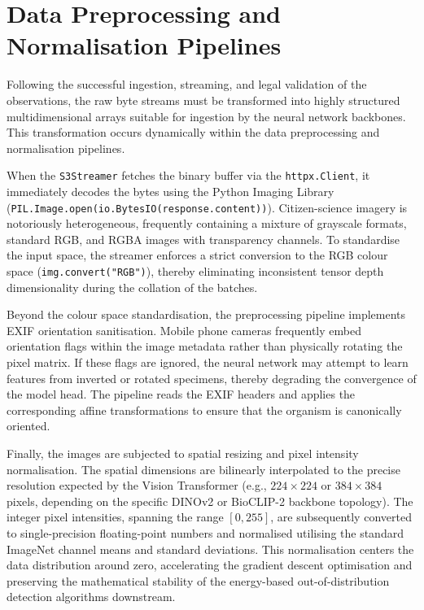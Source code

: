 \section{Data Preprocessing and Normalisation Pipelines}
\label{sec:preprocessing_normalisation}

Following the successful ingestion, streaming, and legal validation of the observations, the raw byte streams must be transformed into highly structured multidimensional arrays suitable for ingestion by the neural network backbones. This transformation occurs dynamically within the data preprocessing and normalisation pipelines.

When the \texttt{S3Streamer} fetches the binary buffer via the \texttt{httpx.Client}, it immediately decodes the bytes using the Python Imaging Library (\texttt{PIL.Image.open(io.BytesIO(response.content))}). Citizen-science imagery is notoriously heterogeneous, frequently containing a mixture of grayscale formats, standard RGB, and RGBA images with transparency channels. To standardise the input space, the streamer enforces a strict conversion to the RGB colour space (\texttt{img.convert("RGB")}), thereby eliminating inconsistent tensor depth dimensionality during the collation of the batches.

Beyond the colour space standardisation, the preprocessing pipeline implements EXIF orientation sanitisation. Mobile phone cameras frequently embed orientation flags within the image metadata rather than physically rotating the pixel matrix. If these flags are ignored, the neural network may attempt to learn features from inverted or rotated specimens, thereby degrading the convergence of the model head. The pipeline reads the EXIF headers and applies the corresponding affine transformations to ensure that the organism is canonically oriented.

Finally, the images are subjected to spatial resizing and pixel intensity normalisation. The spatial dimensions are bilinearly interpolated to the precise resolution expected by the Vision Transformer (e.g., $224 \times 224$ or $384 \times 384$ pixels, depending on the specific DINOv2 or BioCLIP-2 backbone topology). The integer pixel intensities, spanning the range $[0, 255]$, are subsequently converted to single-precision floating-point numbers and normalised utilising the standard ImageNet channel means and standard deviations. This normalisation centers the data distribution around zero, accelerating the gradient descent optimisation and preserving the mathematical stability of the energy-based out-of-distribution detection algorithms downstream.

